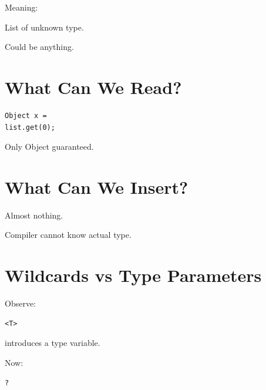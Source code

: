 \documentclass[11pt,a4paper]{book}
\begin{document}

Meaning:


List of unknown type.


Could be anything.


\section{What Can We Read?}

\begin{verbatim} 
Object x =
list.get(0);
\end{verbatim}


Only Object guaranteed.


\section{What Can We Insert?}

Almost nothing.


Compiler cannot know actual type.


\section{Wildcards vs Type Parameters}

Observe:

\begin{verbatim} 
<T>
\end{verbatim}


introduces a type variable.


Now:

\begin{verbatim} 
?
\end{verbatim}
\end{document}
